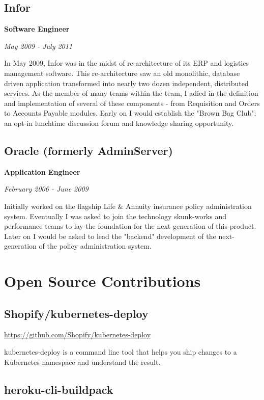 \documentclass[12pt letterpaper notitlepage]{article}
\begin{document}
\subsection*{Infor}
\label{sec:org8e35e45}

\textbf{Software Engineer}

\emph{May 2009 - July 2011}

In May 2009, Infor was in the midst of re-architecture of its ERP and logistics management software. This re-architecture saw an old monolithic, database driven application transformed into nearly two dozen independent, distributed services. As the member of many teams within the team, I adied in the definition and implementation of several of these components - from Requisition and Orders to Accounts Payable modules. Early on I would establish the "Brown Bag Club"; an opt-in lunchtime discussion forum and knowledge sharing opportunity.

\subsection*{Oracle (formerly AdminServer)}
\label{sec:orgcf357d8}

\textbf{Application Engineer}

\emph{February 2006 - June 2009}

Initially worked on the flagship Life \& Annuity insurance policy administration system. Eventually I was asked to join the technology skunk-works and performance teams to lay the foundation for the next-generation of this product. Later on I would be asked to lead the "backend" development of the next-generation of the policy administration system.

\section*{Open Source Contributions}
\label{sec:org7c34910}

\subsection*{Shopify/kubernetes-deploy}
\label{sec:org4c894a0}

\url{https://github.com/Shopify/kubernetes-deploy}

kubernetes-deploy is a command line tool that helps you ship changes to a Kubernetes namespace and understand the result.

\subsection*{heroku-cli-buildpack}
\label{sec:orgf7b9c53}
\end{document}
